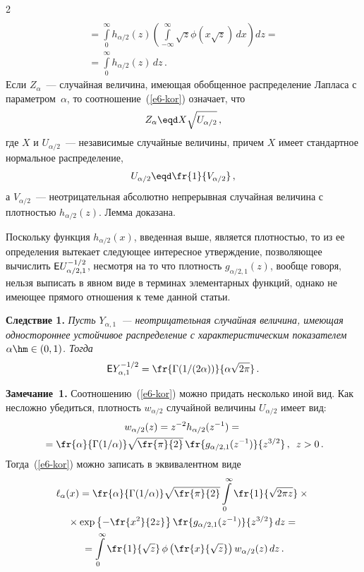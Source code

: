 \begin{multicols}{2}
\begin{multline*}
{}\\
{}=\int\limits_{0}^{\infty}h_{\alpha/2}(z)\left(\int\limits_{-\infty}^{\infty}\sqrt{z}
\phi\left(x\sqrt{z}\right)\,dx\right)dz={}\\
{}=
\int\limits_{0}^{\infty}h_{\alpha/2}(z)\,dz\,.
\end{multline*}
Если $Z_{\alpha}$~--- случайная величина, имеющая обобщенное
распределение Лапласа с параметром~$\alpha$, то соотношение~(\ref{e6-kor})
означает, что
$$
Z_{\alpha}\eqd X \sqrt{U_{\alpha/2}}\,,
$$
где $X$ и $U_{\alpha/2}$~--- независимые случайные величины, причем
$X$ имеет стандартное нормальное распределение,
$$
U_{\alpha/2}\eqd\fr{1}{V_{\alpha/2}}\,,
$$
а $V_{\alpha/2}$~--- неотрицательная абсолютно непрерывная случайная
величина с плотностью $h_{\alpha/2}(z)$. Лемма доказана.

\smallskip

Поскольку функция $h_{\alpha/2}(x)$, введенная выше, является
плотностью, то из ее определения вытекает следующее интересное
утверждение, позволяющее вычислить ${\sf E}U_{\alpha/2,1}^{-1/2}$,
несмотря на то что плот\-ность $g_{\alpha/2,1}(z)$, вообще говоря,
нельзя выписать в явном виде в терминах элементарных функций, однако
не имеющее прямого отношения к теме данной статьи.

\smallskip

\noindent
\textbf{Следствие 1.} {\it Пусть $Y_{\alpha,1}$~--- неотрицательная
случайная величина, имеющая одностороннее устойчивое распределение с
характеристическим показателем $\alpha\hm\in(0,1)$. Тогда}
$$
{\sf E}Y^{-1/2}_{\alpha,1}=\fr{\Gamma({1}/(2\alpha))}{\alpha\sqrt{2\pi}}\,.
$$

\smallskip

\noindent
\textbf{Замечание~1.} Соотношению~(\ref{e6-kor}) можно придать несколько иной вид.
Как несложно убедиться, плотность $w_{\alpha/2}$ случайной величины
$U_{\alpha/2}$ имеет вид:
\begin{multline*}
w_{\alpha/2}(z)=z^{-2}h_{\alpha/2}(z^{-1})={}\\
{}=
\fr{\alpha}{\Gamma({1}/{\alpha})}\sqrt{\fr{\pi}{2}}\,\fr{g_{\alpha/2,1}(z^{-1})}{z^{3/2}}\,,\enskip
z>0\,.
\end{multline*}
Тогда~(\ref{e6-kor}) можно записать в эквивалентном виде
\begin{multline}
\ell_{\alpha}(x)=
\fr{\alpha}{\Gamma({1}/{\alpha})}\sqrt{\fr{\pi}{2}}\int\limits_0^{\infty}
\fr{1}{\sqrt{2\pi
z}}\times{}\\
{}\times\exp\left\{-\fr{x^2}{2z}\right\}\fr{g_{\alpha/2,1}(z^{-1})}{z^{3/2}}\,dz={}\\
{}=
\int\limits_0^{\infty}\fr{1}{\sqrt{z}}\,\phi\left(\fr{x}{\sqrt{z}}\right)w_{\alpha/2}(z)\,dz\,.
\label{e7-kor}
\end{multline}


\end{multicols}
